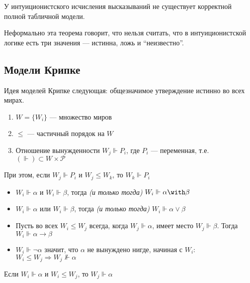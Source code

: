 \begin{theorem}
    У интуиционистского исчисления высказываний не существует корректной полной табличной модели.
\end{theorem}

Неформально эта теорема говорит, что нельзя считать, что в интуиционистской логике есть три значения --- истинна, ложь и ``неизвестно''.

\subsection{Модели Крипке}

Идея моделей Крипке следующая: общезначимое утверждение истинно во всех мирах.

\begin{definition}\itemfix
    \begin{enumerate}
        \item \(W = \{W_i\}\) --- множество миров
        \item \( \leq \) --- частичный порядок на \(W\)
        \item Отношение вынужденности \(W_j \Vdash P_i\), где \(P_i\) --- переменная, т.е. \((\Vdash) \subset W \times \mathcal{P}\)
    \end{enumerate}

    При этом, если \(W_j \Vdash P_i\) и \(W_j \leq W_k\), то \(W_k \Vdash P_i\)
\end{definition}

\begin{definition}\itemfix
    \begin{itemize}
        \item \(W_i \Vdash \alpha\) и \(W_i \Vdash \beta\), тогда \textit{(и только тогда)} \(W_i \Vdash \alpha \with \beta\)
        \item \(W_i \Vdash \alpha\) или \(W_i \Vdash \beta\), тогда \textit{(и только тогда)} \(W_i \Vdash \alpha \lor \beta\)
        \item Пусть во всех \(W_i \leq W_j\) всегда, когда \(W_j \Vdash \alpha\), имеет место \(W_j \Vdash \beta\). Тогда \(W_i \Vdash \alpha \to \beta\)
        \item \(W_i \Vdash \neg \alpha\) значит, что \(\alpha\) не вынуждено нигде, начиная с \(W_i\): \(W_i \leq W_j \Rightarrow W_j \nVdash \alpha\)
    \end{itemize}
\end{definition}

\begin{theorem}
    Если \(W_i \Vdash \alpha\) и \(W_i \leq W_j\), то \(W_j \Vdash \alpha\)
\end{theorem}

